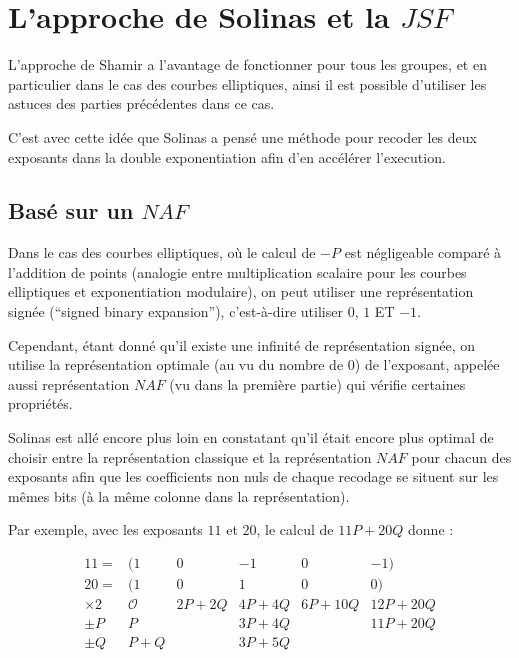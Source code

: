 \documentclass[12pt, a4paper]{memoir}
\begin{document}
\section{L'approche de Solinas et la $JSF$}

L'approche de Shamir a l'avantage de fonctionner pour tous les groupes, et en particulier dans le cas des courbes 
elliptiques, ainsi il est possible d'utiliser les astuces des parties précédentes dans ce cas.

C'est avec cette idée que Solinas a pensé une méthode pour recoder les deux exposants dans la double exponentiation 
afin d'en accélérer l'execution.

\subsection{Basé sur un $NAF$}

Dans le cas des courbes elliptiques, où le calcul de $-P$ est négligeable comparé à l'addition de points
(analogie entre multiplication scalaire pour les courbes elliptiques et exponentiation modulaire),
on peut utiliser une représentation signée (``signed binary expansion''), c'est-à-dire utiliser $0$, $1$ ET $-1$.

Cependant, étant donné qu'il existe une infinité de représentation signée, on utilise la représentation optimale
(au vu du nombre de $0$) de l'exposant, appelée aussi représentation $NAF$ (vu dans la première partie) qui 
vérifie certaines propriétés.

Solinas est allé encore plus loin en constatant qu'il était encore plus optimal de choisir entre la représentation classique 
et la représentation $NAF$ pour chacun des exposants afin que les coefficients non nuls de chaque recodage se situent
sur les mêmes bits (à la même colonne dans la représentation).

Par exemple, avec les exposants $11$ et $20$, le calcul de $11P + 20Q$ donne :

  $$\begin{array}{ccccccc}
  11 = & (1 & 0 & -1 & 0 & -1) \\
  20 = & (1 & 0 & 1 & 0 & 0) \\
  \times 2 & \mathcal{O} & 2P + 2Q & 4P + 4Q & 6P + 10Q & 12P + 20Q \\
  \pm P      & P           & \,      & 3P + 4Q &    \,    & 11P + 20Q \\
  \pm Q      & P + Q       & \,      & 3P + 5Q &    \,    & \,
  \end{array}$$
\end{document}

